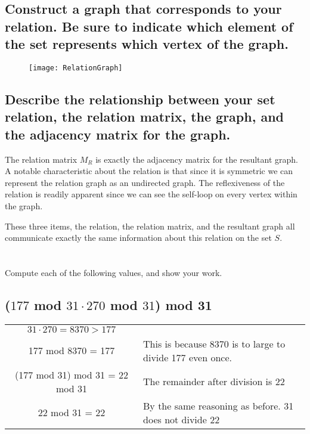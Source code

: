 \documentclass{article}
\begin{document}
\subsection{Construct a graph that corresponds to your relation. Be sure to indicate which element of the
set represents which vertex of the graph.}


\begin{figure}[H]
\centering
\texttt{[image: RelationGraph]}
\end{figure}

\subsection{Describe the relationship between your set relation, the relation matrix, the graph, and the adjacency matrix for the graph.}

The relation matrix $M_R$ is exactly the adjacency matrix for the resultant graph. A notable characteristic about the relation is that since it is symmetric we can represent the relation graph as an undirected graph. The reflexiveness of the relation is readily apparent since we can see the self-loop on every vertex within the graph. 

These three items, the relation, the relation matrix, and the resultant graph all communicate exactly the same information about this relation on the set $S$.

\newpage
\section{} %


\newpage
\section{} %
Compute each of the following values, and show your work.
\subsection{($177$ mod $31\cdot 270$ mod $31$) mod 31}
\begin{center}
\begin{tabular}{cl}
$31\cdot 270 = 8370 > 177$ \\
177 mod 8370 = 177 & This is because 8370 is to large to divide 177 even once. \\
(177 mod 31) mod 31 = 22 mod 31 & The remainder after division is 22 \\
22 mod 31 = 22 & By the same reasoning as before. 31 does not divide 22
\end{tabular}
\end{center}
\end{document}
